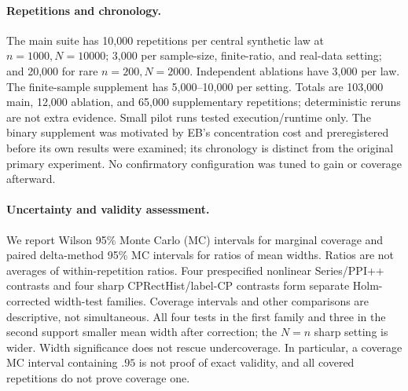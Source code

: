 \documentclass{article}
\begin{document}
\paragraph{Repetitions and chronology.}
The main suite has 10,000 repetitions per central synthetic law at $n=1000,N=10000$; 3,000 per sample-size, finite-ratio, and real-data setting; and 20,000 for rare $n=200,N=2000$. Independent ablations have 3,000 per law. The finite-sample supplement has 5,000--10,000 per setting. Totals are 103,000 main, 12,000 ablation, and 65,000 supplementary repetitions; deterministic reruns are not extra evidence. Small pilot runs tested execution/runtime only. The binary supplement was motivated by EB's concentration cost and preregistered before its own results were examined; its chronology is distinct from the original primary experiment. No confirmatory configuration was tuned to gain or coverage afterward.

\paragraph{Uncertainty and validity assessment.}
We report Wilson 95\% Monte Carlo (MC) intervals for marginal coverage and paired delta-method 95\% MC intervals for ratios of mean widths. Ratios are not averages of within-repetition ratios. Four prespecified nonlinear Series/PPI++ contrasts and four sharp CPRectHist/label-CP contrasts form separate Holm-corrected width-test families. Coverage intervals and other comparisons are descriptive, not simultaneous. All four tests in the first family and three in the second support smaller mean width after correction; the $N=n$ sharp setting is wider. Width significance does not rescue undercoverage. In particular, a coverage MC interval containing $.95$ is not proof of exact validity, and all covered repetitions do not prove coverage one.

\begin{table}[t]
\caption{Full-budget asymptotic comparison at $n=1000,N=10000$. Series4/PPI++ is the paired ratio of mean widths, with 95\% MC intervals. Coverage brackets are marginal Wilson 95\% MC intervals, not guarantees or multiplicity-adjusted tests. Narrower normal intervals do not count as finite-sample-valid gains.}
\label{tab:asym}
\centering\small

\end{table}
\end{document}

